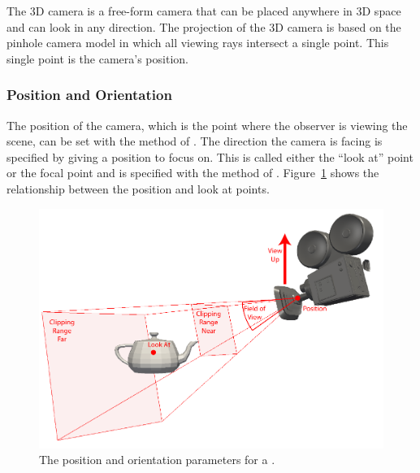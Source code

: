 
The 3D camera is a free-form camera that can be placed anywhere in 3D space
and can look in any direction. The projection of the 3D camera is based on
the  pinhole camera model in
which all viewing rays intersect a single point. This single point is the
camera's position.

\subsubsection{Position and Orientation}


The position of the camera, which is the point where the observer is
viewing the scene, can be set with the  method of
. The direction the camera is facing is specified by
giving a position to focus on. This is called either the ``look at'' point
or the focal point and is specified with the  method of
. Figure~\ref{fig:CameraPositionOrientation3D} shows
the relationship between the position and look at points.

\begin{figure}[htb]
  \centering
  \includegraphics{images/CameraPositionOrientation}
  \caption{The position and orientation parameters for a
    .}
  \label{fig:CameraPositionOrientation3D}
\end{figure}

